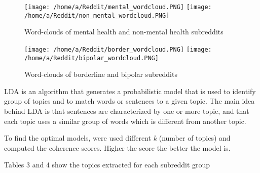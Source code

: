 \documentclass{article}
\begin{document}
\begin{figure}[H]
	\texttt{[image: /home/a/Reddit/mental\_wordcloud.PNG]}
	\hfill
	\texttt{[image: /home/a/Reddit/non\_mental\_wordcloud.PNG]}
	\caption {Word-clouds of mental health and non-mental health subreddits}
\end{figure}
\begin{figure}[H]
	\texttt{[image: /home/a/Reddit/border\_wordcloud.PNG]}
	\hfill
	\texttt{[image: /home/a/Reddit/bipolar\_wordcloud.PNG]}
	\caption {Word-clouds of borderline and bipolar subreddits}
\end{figure}


LDA is an algorithm that generates a probabilistic model that is used to identify group of topics and to match words or sentences to a given topic. The main idea behind LDA is that sentences are characterized by one or more topic, and that each topic uses a similar group of words which is different from another topic.

To find the optimal models, were used different \emph{k} (number of topics) and computed the coherence scores. Higher the score the better the model is.

Tables 3 and 4 show the topics extracted for each subreddit group
\end{document}
